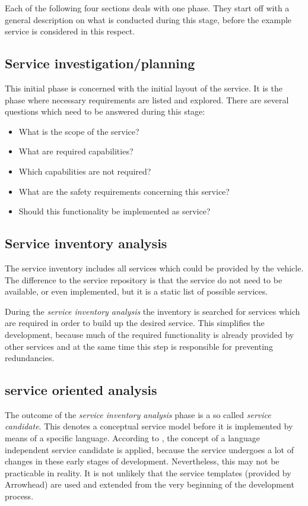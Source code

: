 Each of the following four sections deals with one phase. They start off with a general description on what is conducted during this stage, before the example service is considered in this respect.




\subsection{Service investigation/planning}
This initial phase is concerned with the initial layout of the service. It is the phase where necessary requirements are listed and explored. There are several questions which need to be answered during this stage:
\begin{itemize}
\item What is the scope of the service?
\item What are required capabilities?
\item Which capabilities are not required?
\item What are the safety requirements concerning this service?
\item Should this functionality be implemented as service?
\end{itemize}



\subsection{Service inventory analysis}
The service inventory includes all services which could be provided by the vehicle. The difference to the service repository is that the service do not need to be available, or even implemented, but it is a static list of possible services.

During the \emph{service inventory analysis} the inventory is searched for services which are required in order to build up the desired service. This simplifies the development, because much of the required functionality is already provided by other services and at the same time this step is responsible for preventing redundancies.




\subsection{service oriented analysis}

The outcome of the \emph{service inventory analysis} phase is a so called \emph{service candidate}. This denotes a conceptual service model before it is implemented by means of a specific language. According to \cite[p.42]{erl2011}, the concept of a language independent service candidate is applied, because the service undergoes a lot of changes in these early stages of development. Nevertheless, this may not be practicable in reality. It is not unlikely that the service templates (provided by Arrowhead) are used and extended from the very beginning of the development process.

